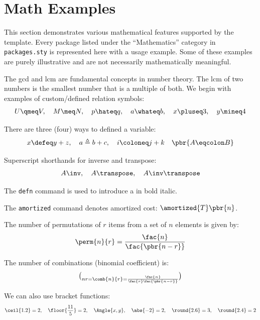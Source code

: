 \section{Math Examples}
This section demonstrates various mathematical features supported by the template. Every package listed under the \enquote{Mathematics} category in \texttt{packages.sty} is represented here with a usage example. Some of these examples are purely illustrative and are not necessarily mathematically meaningful.

The \gls{gcd} and \gls{lcm} are fundamental concepts in number theory. The \gls{lcm} of two numbers is the smallest number that is a multiple of both. We begin with examples of custom\-/defined relation symbols:
\begin{equation*}
    U \qmeq V,
    \quad M \meq N,
    \quad p \hateq q,
    \quad a \whateq b,
    \quad x \pluseq 3,
    \quad y \mineq 4
\end{equation*}

There are three (four) ways to defined a variable:
\begin{equation*}
    x \defeq y + z,
    \quad a \triangleq b + c,
    \quad i \coloneq j + k
    \quad \pbr{A \eqcolon B}
\end{equation*}

Superscript shorthands for inverse and transpose:
\begin{equation*}
    A\inv,
    \quad A\transpose,
    \quad {A\inv}\transpose
\end{equation*}

The \texttt{defn} command is used to introduce a  in bold italic.

The \texttt{amortized} command denotes amortized cost: $\amortized{T}\pbr{n}$.

The number of permutations of $r$ items from a set of $n$ elements is given by:
\begin{equation*}
    \perm{n}{r} = \frac{\fac{n}}{\fac{\pbr{n - r}}}
\end{equation*}

The number of combinations (binomial coefficient) is:
\begin{equation*}
    \choose{n}{r} = \comb{n}{r} = \frac{\fac{n}}{\fac{r}\fac{\pbr{n - r}}}
\end{equation*}

We can also use bracket functions:
\begin{equation*}
    \ceil{1.2} = 2,
    \quad \floor{\frac{11}{5}} = 2,
    \quad \Angle{x, y},
    \quad \abs{-2} = 2,
    \quad \round{2.6} = 3,
    \quad \round{2.4} = 2
\end{equation*}

